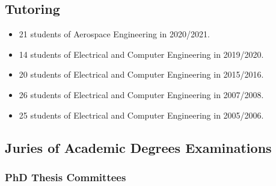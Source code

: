 \subsection{Tutoring}\label{tutoring-1}

\begin{itemize}
\item
  21 students of Aerospace Engineering in 2020/2021.
\item
  14 students of Electrical and Computer Engineering in 2019/2020.
\item
  20 students of Electrical and Computer Engineering in 2015/2016.
\item
  26 students of Electrical and Computer Engineering in 2007/2008.
\item
  25 students of Electrical and Computer Engineering in 2005/2006.
\end{itemize}

\subsection{Juries of Academic Degrees
Examinations}\label{juries-of-academic-degrees-examinations}

\subsubsection{PhD Thesis Committees}\label{phd-thesis-committees}

